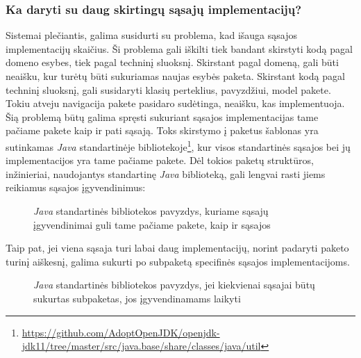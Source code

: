 \subsubsection{Ka daryti su daug skirtingų sąsajų implementacijų?}
Sistemai plečiantis, galima susidurti su problema, kad išauga sąsajos implementacijų skaičius. Ši problema gali iškilti
tiek bandant skirstyti kodą pagal domeno esybes, tiek pagal techninį sluoksnį. Skirstant pagal domeną, gali būti neaišku, kur turėtų
būti sukuriamas naujas esybės paketa. Skirstant kodą pagal techninį sluoksnį, gali susidaryti klasių perteklius, pavyzdžiui,
model pakete. Tokiu atveju navigacija pakete pasidaro sudėtinga, neaišku, kas implementuoja.
Šią problemą būtų galima spręsti sukuriant sąsajos implementacijas tame pačiame pakete kaip ir pati sąsają.
Toks skirstymo į paketus šablonas yra sutinkamas \textit{Java} standartinėje bibliotekoje\footnote{\url{https://github.com/AdoptOpenJDK/openjdk-jdk11/tree/master/src/java.base/share/classes/java/util}},
kur visos standartinės sąsajos bei jų implementacijos yra tame pačiame pakete.
Dėl tokios paketų struktūros, inžinieriai, naudojantys standartinę \textit{Java} biblioteką, gali lengvai rasti jiems reikiamus sąsajos įgyvendinimus:
\begin{figure}[H]
    \snugshade
    \endsnugshade
    \caption{\textit{Java} standartinės bibliotekos pavyzdys, kuriame sąsajų įgyvendinimai guli tame pačiame pakete, kaip ir sąsajos}
\end{figure}
Taip pat, jei viena sąsaja turi labai daug implementacijų, norint padaryti paketo turinį aiškesnį, galima sukurti po subpaketą
specifinės sąsajos implementacijoms.
\begin{figure}[H]
    \snugshade
    \endsnugshade
    \caption{\textit{Java} standartinės bibliotekos pavyzdys, jei kiekvienai sąsajai būtų sukurtas subpaketas, jos įgyvendinamams laikyti}
\end{figure}


